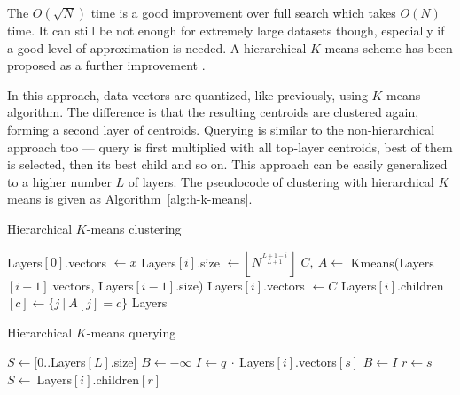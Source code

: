 
The $O(\sqrt{N})$ time is a good improvement over full search which 
takes $O(N)$ time. It can still be not enough for extremely large datasets
though, especially if a good level of approximation is needed. A hierarchical
$K$-means scheme has been proposed as a further improvement \cite{kmeans}.

In this approach, data vectors are quantized, like previously,
using $K$-means algorithm.
The difference is that the resulting centroids are clustered again, forming
a second layer of centroids. Querying is similar to the non-hierarchical
approach too --- query is first multiplied with all top-layer centroids,
best of them is selected, then its best child and
so on. This approach can be easily generalized to a higher number $L$  of layers.
The pseudocode of clustering with hierarchical $K$ means is given as Algorithm~\ref{alg:h-k-means}.

\begin{algorithm}
	\caption{Hierarchical $K$-means clustering}
	\begin{algorithmic}
		\State Layers$[0]$.vectors $\gets x $
			\State Layers$[i]$.size $\gets \left \lfloor N^{\frac{L + 1 - i}{L + 1}} \right \rfloor $
			\State $ C,\ A \gets$ Kmeans(Layers$[i - 1]$.vectors, Layers$[i - 1]$.size)
			\State Layers$[i]$.vectors $\gets C$
				\State Layers$[i]$.children$[c] \gets \{ j\ |\ A[j] = c \} $
			\EndFor
		\EndFor
		\State \Return Layers
	\end{algorithmic}
\label{alg:h-k-means}
\end{algorithm}

\begin{algorithm}[H]
	\caption{Hierarchical $K$-means querying}
	\begin{algorithmic}
		\State $ S \gets [0..$Layers$[L].$size$]$
		\For{$ i = L,\dots,0 $}
			\State $ B \gets -\infty $
			\For{$ s \in S $}
				\State $ I \gets q\ \cdot\ $Layers$[i]$.vectors$[s]$
				\If{$ I > B $}
					\State $ B \gets I $
					\State $ r \gets s $
				\EndIf
			\EndFor
			\If{$ i = 0 $}
				\State \Return {$ r $}
			\EndIf
			\State $ S \gets\ $Layers$[i].$children$[r]$
		\EndFor
	\end{algorithmic}
\end{algorithm}


